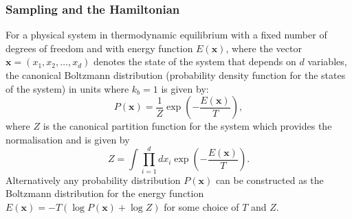 \documentclass[12pt]{article}
\begin{document}
        \subsubsection{Sampling and the Hamiltonian}
            \label{sec:SamplingAndTheHamiltonian}
            For a physical system in thermodynamic equilibrium with a fixed number of degrees of freedom and with energy function $E\left(\bm{x}\right)$, where the vector $\bm{x} = \left(x_{1},x_{2},\dots,x_{d}\right)$ denotes the state of the system that depends on $d$ variables, the canonical Boltzmann distribution (probability density function for the states of the system) in units where $k_b=1$ is given by:
            \begin{equation}
                \label{eq:BoltzmannDistribution}
                P\left(\bm{x}\right) = \frac{1}{Z} \exp{\left(-\frac{E\left(\bm{x}\right)}{T} \right)},
            \end{equation}
            where $Z$ is the canonical partition function for the system which provides the normalisation and is given by 
            \begin{equation}
                \label{eq:JointPartitionFunction}
                Z = \int\prod_{i=1}^{d}dx_{i} \exp{\left(-\frac{E\left(\bm{x}\right)}{T} \right)}.
            \end{equation}
            Alternatively any probability distribution $P\left(\bm{x}\right)$ can be constructed as the Boltzmann distribution for the energy function $ E\left(\bm{x}\right) = -T\left(\log{P\left(\bm{x}\right)} + \log{Z}\right)$ for some choice of $T$ and $Z$. 
\end{document}
